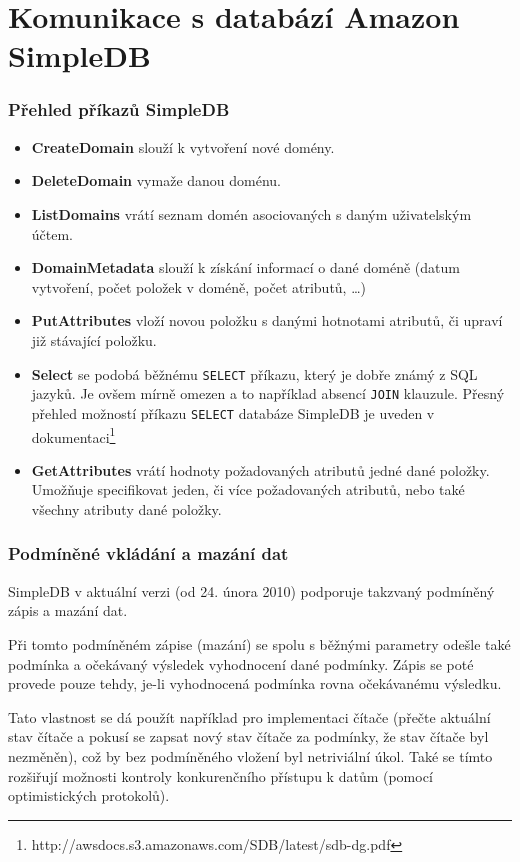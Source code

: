 \documentclass[oneside,11pt]{fithesis2}
\begin{document}
\chapter{Komunikace s databází Amazon SimpleDB}
\subsection*{Přehled příkazů SimpleDB}
\begin{itemize}
 \item \textbf{CreateDomain} slouží k vytvoření nové domény.
 \item \textbf{DeleteDomain} vymaže danou doménu.
 \item \textbf{ListDomains} vrátí seznam domén asociovaných s daným uživatelským účtem.
 \item \textbf{DomainMetadata} slouží k získání informací o dané doméně (datum vytvoření, počet položek v doméně, počet atributů, \dots)
 \item \textbf{PutAttributes} vloží novou položku s danými hotnotami atributů, či upraví již stávající položku.
 \item \textbf{Select} se podobá běžnému \verb<SELECT< příkazu, který je dobře známý z SQL jazyků. Je ovšem mírně omezen a to například absencí \verb<JOIN< klauzule. Přesný přehled možností příkazu \verb<SELECT< databáze SimpleDB je uveden v dokumentaci\footnote{http://awsdocs.s3.amazonaws.com/SDB/latest/sdb-dg.pdf}
 \item \textbf{GetAttributes} vrátí hodnoty požadovaných atributů jedné dané položky. Umožňuje specifikovat jeden, či více požadovaných atributů, nebo také všechny atributy dané položky.
\end{itemize}

\subsection*{Podmíněné vkládání a mazání dat}
SimpleDB v aktuální verzi (od 24. února 2010) podporuje takzvaný podmíněný zápis a mazání dat. 

Při tomto podmíněném zápise (mazání) se spolu s běžnými parametry odešle také podmínka a očekávaný výsledek vyhodnocení dané podmínky. Zápis se poté provede pouze tehdy, je-li vyhodnocená podmínka rovna očekávanému výsledku.

Tato vlastnost se dá použít například pro implementaci čítače (přečte aktuální stav čítače a pokusí se zapsat nový stav čítače za podmínky, že stav čítače byl nezměněn), což by bez podmíněného vložení byl netriviální úkol. Také se tímto rozšiřují možnosti kontroly konkurenčního přístupu k datům (pomocí optimistických protokolů).
\end{document}
